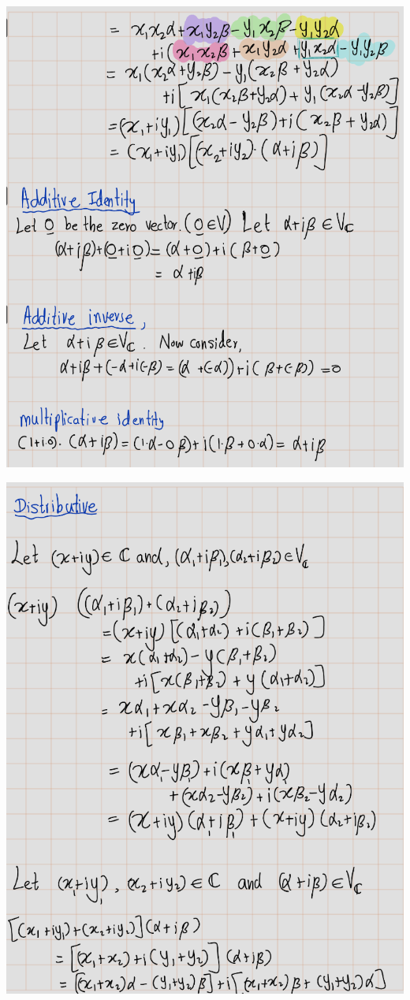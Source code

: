 \documentclass[
]{book}
\theoremstyle{definition}
\theoremstyle{definition}
\theoremstyle{definition}
\theoremstyle{definition}
\theoremstyle{remark}
\begin{document}
\includegraphics[width=9.89in]{fig/Ex1B/Ex8-3}

\includegraphics[width=9.58in]{fig/Ex1B/Ex8-4}
\end{document}
